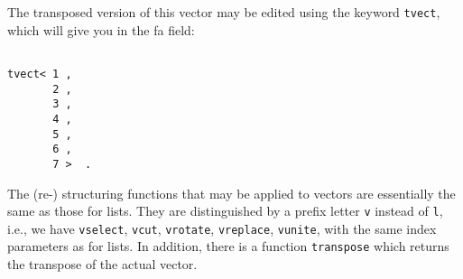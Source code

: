 The transposed version of this vector may be edited using
the keyword {\tt tvect}, which will give you in the {\sc fa}
field:
\begin{verbatim}

tvect< 1 ,
       2 ,
       3 ,
       4 ,
       5 ,
       6 ,
       7 >  .

\end{verbatim}
The (re-) {\mys structuring functions} that may be applied to vectors
are essentially the same as those for lists. They are 
distinguished by a prefix letter {\tt v} instead of {\tt  l},
i.e., we have {\tt vselect}, {\tt vcut}, {\tt vrotate},
{\tt vreplace}, {\tt vunite}, with the same index
parameters as for lists. In addition, there is a function
{\tt transpose} which returns the transpose of the actual
vector.

